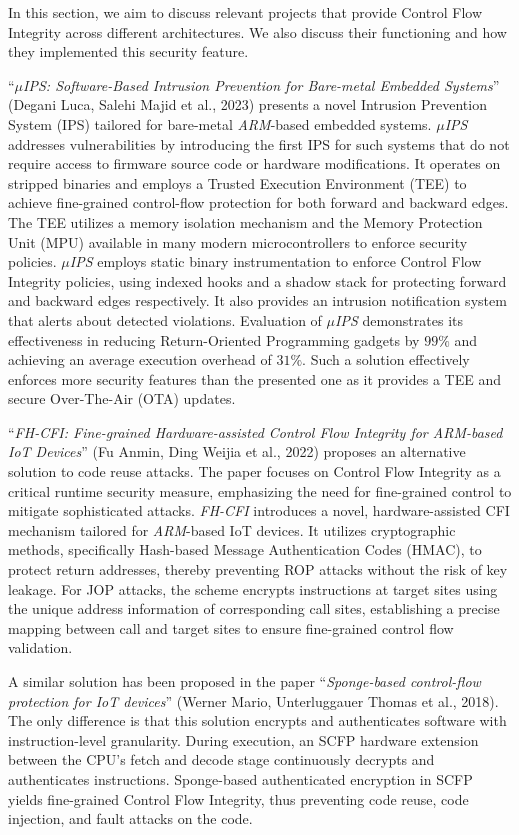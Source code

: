 In this section, we aim to discuss relevant projects that provide Control Flow Integrity
across different architectures. We also discuss their functioning and how they
implemented this security feature.

``\textit{$\mu$IPS: Software-Based Intrusion Prevention for Bare-metal Embedded
Systems}'' (Degani Luca, Salehi Majid et al., 2023)\cite{Degani} presents a novel
Intrusion Prevention System (IPS) tailored for bare-metal \textit{ARM}-based
embedded systems. \textit{$\mu$IPS} addresses vulnerabilities by introducing the
first IPS for such systems that do not require access to firmware source code or
hardware modifications. It operates on stripped binaries and employs a Trusted Execution
Environment (TEE) to achieve fine-grained control-flow protection for both forward
and backward edges. The TEE utilizes a memory isolation mechanism and the Memory
Protection Unit (MPU) available in many modern microcontrollers to enforce
security policies. \textit{$\mu$IPS} employs static binary instrumentation to
enforce Control Flow Integrity policies, using indexed hooks and a shadow stack for
protecting forward and backward edges respectively. It also provides an
intrusion notification system that alerts about detected violations. Evaluation of
\textit{$\mu$IPS} demonstrates its effectiveness in reducing Return-Oriented
Programming gadgets by $99\%$ and achieving an average execution overhead of
$31\%$. Such a solution effectively enforces more security features than the presented
one as it provides a TEE and secure Over-The-Air (OTA) updates.

``\textit{FH-CFI: Fine-grained Hardware-assisted Control Flow Integrity for ARM-based
IoT Devices}'' (Fu Anmin, Ding Weijia et al., 2022)\cite{fhcfi} proposes an
alternative solution to code reuse attacks. The paper focuses on Control Flow Integrity
as a critical runtime security measure, emphasizing the need for fine-grained
control to mitigate sophisticated attacks. \textit{FH-CFI} introduces a novel, hardware-assisted
CFI mechanism tailored for \textit{ARM}-based IoT devices. It utilizes cryptographic
methods, specifically Hash-based Message Authentication Codes (HMAC), to protect
return addresses, thereby preventing ROP attacks without the risk of key leakage.
For JOP attacks, the scheme encrypts instructions at target sites using the
unique address information of corresponding call sites, establishing a precise mapping
between call and target sites to ensure fine-grained control flow validation.

A similar solution has been proposed in the paper ``\textit{Sponge-based control-flow
protection for IoT devices}'' (Werner Mario, Unterluggauer Thomas et al., 2018)\cite{Sponge}.
The only difference is that this solution encrypts and authenticates software with
instruction-level granularity. During execution, an SCFP hardware extension between
the CPU's fetch and decode stage continuously decrypts and authenticates instructions.
Sponge-based authenticated encryption in SCFP yields ﬁne-grained Control Flow
Integrity, thus preventing code reuse, code injection, and fault attacks on the code.

